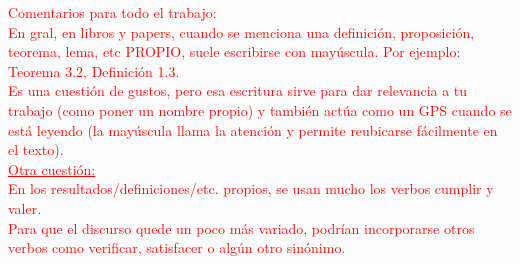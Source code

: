 \textcolor{red}{Comentarios para todo el trabajo: \\
En gral, en libros y papers, cuando se menciona una definición, proposición, teorema, lema, etc PROPIO, suele escribirse con mayúscula. Por ejemplo: Teorema 3.2, Definición 1.3. \\
Es una cuestión de gustos, pero esa escritura sirve para dar relevancia a tu trabajo (como poner un nombre propio) y también actúa como un GPS cuando se está leyendo (la mayúscula llama la atención y permite reubicarse fácilmente en el texto).
\\
\underline{Otra cuestión:} \\
En los resultados/definiciones/etc. propios, se usan mucho los verbos cumplir y valer. \\
Para que el discurso quede un poco más variado,  podrían incorporarse otros verbos como  verificar, satisfacer  o algún otro sinónimo.}
